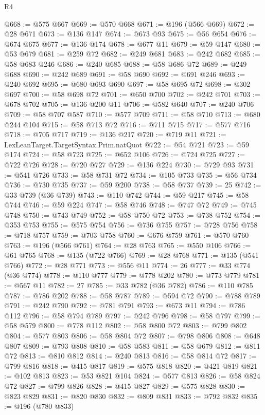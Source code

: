 \begin{lexlean}{R4}
\begin{coremodule}
@668 := @575 @667
@669 := @570 @668
@671 := @196 (@566 @669)
@672 := @28 @671
@673 := @136 @147
@674 := @673 @93
@675 := @56 @654
@676 := @674 @675
@677 := @136 @174
@678 := @677 @11
@679 := @59 @147
@680 := @53 @679
@681 := @259 @72
@682 := @249 @681
@683 := @242 @682
@685 := @58 @683 @246
@686 := @240 @685
@688 := @58 @686 @72
@689 := @249 @688
@690 := @242 @689
@691 := @58 @690
@692 := @691 @246
@693 := @240 @692
@695 := @680 @693 @690
@697 := @58 @695 @72
@698 := @302 @697
@700 := @58 @698 @72
@701 := @650 @700
@702 := @242 @701
@703 := @678 @702
@705 := @136 @200 @11
@706 := @582 @640
@707 := @240 @706
@709 := @58 @707 @587
@710 := @577 @709
@711 := @58 @710
@713 := @680 @244 @104
@715 := @58 @713 @72
@716 := @711 @715
@717 := @577 @716
@718 := @705 @717
@719 := @136 @217
@720 := @719 @11
@721 := LexLeanTarget.TargetSyntax.Prim.natQuot
@722 := @54 @721
@723 := @59 @174
@724 := @58 @723
@725 := @652 @106
@726 := @724 @725
@727 := @722 @726
@728 := @720 @727
@729 := @136 @224
@730 := @729 @93
@731 := @541 @726
@733 := @58 @731 @72
@734 := @105 @733
@735 := @56 @734
@736 := @730 @735
@737 := @59 @200
@738 := @58 @737
@739 := 25
@742 := @33 @739 (@36 @739)
@743 := @110 @742
@744 := @59 @217
@745 := @58 @744
@746 := @59 @224
@747 := @58 @746
@748 := @747 @72
@749 := @745 @748
@750 := @743 @749
@752 := @58 @750 @72
@753 := @738 @752
@754 := @353 @753
@755 := @575 @754
@756 := @736 @755
@757 := @728 @756
@758 := @718 @757
@759 := @703 @758
@760 := @676 @759
@761 := @570 @760
@763 := @196 (@566 @761)
@764 := @28 @763
@765 := @550 @106
@766 := @61 @765
@768 := @135 (@722 @766)
@769 := @28 @768
@771 := @135 (@541 @766)
@772 := @28 @771
@773 := @556 @11
@774 := 26
@777 := @33 @774 (@36 @774)
@778 := @110 @777
@779 := @778 @202
@780 := @773 @779
@781 := @567 @11
@782 := 27
@785 := @33 @782 (@36 @782)
@786 := @110 @785
@787 := @786 @202
@788 := @58 @787
@789 := @594 @72
@790 := @788 @789
@791 := @242 @790
@792 := @781 @791
@793 := @673 @11
@794 := @786 @112
@796 := @58 @794 @789
@797 := @242 @796
@798 := @58 @797
@799 := @58 @579
@800 := @778 @112
@802 := @58 @800 @72
@803 := @799 @802
@804 := @577 @803
@806 := @58 @804 @72
@807 := @798 @806
@808 := @648 @807
@809 := @793 @808
@810 := @58 @583
@811 := @58 @679
@812 := @811 @72
@813 := @810 @812
@814 := @240 @813
@816 := @58 @814 @72
@817 := @799 @816
@818 := @415 @817
@819 := @575 @818
@820 := @421 @819
@821 := @102 @813
@823 := @53 @821 @104
@824 := @577 @813
@826 := @58 @824 @72
@827 := @799 @826
@828 := @415 @827
@829 := @575 @828
@830 := @823 @829
@831 := @820 @830
@832 := @809 @831
@833 := @792 @832
@835 := @196 (@780 @833)

\end{coremodule}
\end{lexlean}
